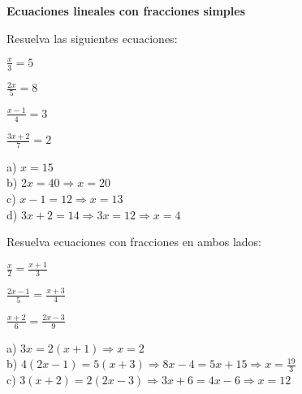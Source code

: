 \begin{exercise}
\textbf{Ecuaciones lineales con fracciones simples}

\problem Resuelva las siguientes ecuaciones:
\begin{exerciselist}
    \item $\frac{x}{3} = 5$
    \item $\frac{2x}{5} = 8$
    \item $\frac{x-1}{4} = 3$
    \item $\frac{3x+2}{7} = 2$
\end{exerciselist}

\begin{solucion}
a) $x = 15$\\
b) $2x = 40 \Rightarrow x = 20$\\
c) $x - 1 = 12 \Rightarrow x = 13$\\
d) $3x + 2 = 14 \Rightarrow 3x = 12 \Rightarrow x = 4$
\end{solucion}

\problem Resuelva ecuaciones con fracciones en ambos lados:
\begin{exerciselist}
    \item $\frac{x}{2} = \frac{x+1}{3}$
    \item $\frac{2x-1}{5} = \frac{x+3}{4}$
    \item $\frac{x+2}{6} = \frac{2x-3}{9}$
\end{exerciselist}

\begin{solucion}
a) $3x = 2(x+1) \Rightarrow x = 2$\\
b) $4(2x-1) = 5(x+3) \Rightarrow 8x-4 = 5x+15 \Rightarrow x = \frac{19}{3}$\\
c) $3(x+2) = 2(2x-3) \Rightarrow 3x+6 = 4x-6 \Rightarrow x = 12$
\end{solucion}
\end{exercise}

